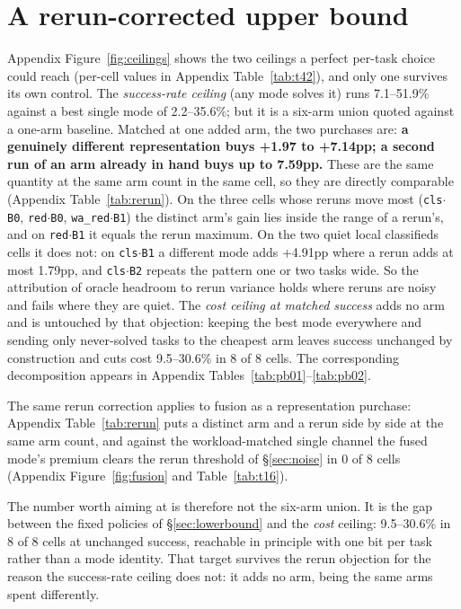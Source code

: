 \section{A rerun-corrected upper bound}\label{sec:upperbound}

 Appendix Figure~\ref{fig:ceilings} shows the two ceilings a perfect per-task choice could reach (per-cell values in Appendix Table~\ref{tab:t42}), and only one survives its own control. The \emph{success-rate ceiling} (any mode solves it) runs 7.1--51.9\% against a best single mode of 2.2--35.6\%; but it is a six-arm union quoted against a one-arm baseline. Matched at one added arm, the two purchases are: \textbf{a genuinely different representation buys +1.97 to +7.14pp; a second run of an arm already in hand buys up to 7.59pp.} These are the same quantity at the same arm count in the same cell, so they are directly comparable (Appendix Table~\ref{tab:rerun}). On the three cells whose reruns move most (\texttt{cls$\cdot$B0}, \texttt{red$\cdot$B0}, \texttt{wa\_red$\cdot$B1}) the distinct arm's gain lies inside the range of a rerun's, and on \texttt{red$\cdot$B1} it equals the rerun maximum. On the two quiet local classifieds cells it does not: on \texttt{cls$\cdot$B1} a different mode adds +4.91pp where a rerun adds at most 1.79pp, and \texttt{cls$\cdot$B2} repeats the pattern one or two tasks wide. So the attribution of oracle headroom to rerun variance holds where reruns are noisy and fails where they are quiet. The \emph{cost ceiling at matched success} adds no arm and is untouched by that objection: keeping the best mode everywhere and sending only never-solved tasks to the cheapest arm leaves success unchanged by construction and cuts cost 9.5--30.6\% in 8 of 8 cells. The corresponding decomposition appears in Appendix Tables~\ref{tab:pb01}--\ref{tab:pb02}.

The same rerun correction applies to fusion as a representation purchase: Appendix Table~\ref{tab:rerun} puts a distinct arm and a rerun side by side at the same arm count, and against the workload-matched single channel the fused mode's premium clears the rerun threshold of \S\ref{sec:noise} in 0 of 8 cells (Appendix Figure~\ref{fig:fusion} and Table~\ref{tab:t16}).

 The number worth aiming at is therefore not the six-arm union. It is the gap between the fixed policies of \S\ref{sec:lowerbound} and the \emph{cost} ceiling: 9.5--30.6\% in 8 of 8 cells at unchanged success, reachable in principle with one bit per task rather than a mode identity. That target survives the rerun objection for the reason the success-rate ceiling does not: it adds no arm, being the same arms spent differently.
